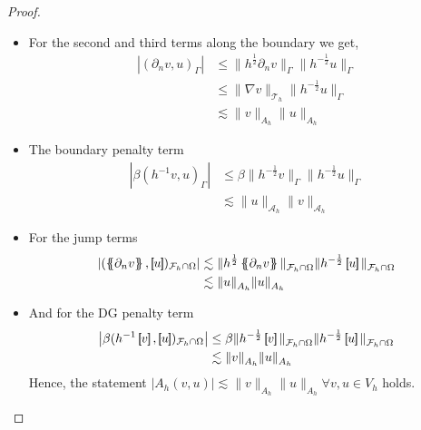 \begin{proof}
\begin{enumerate}[label=\arabic*)]
\begin{itemize}
        \item For the second and third terms along the boundary we get,
            \[
                \begin{split}
                 \left\lvert ( \partial _{n} v,  u)_{\Gamma } \right\rvert & \le \|h^{\frac{1}{2}} \partial _{n}v  \|_{ \Gamma   }^{  } \| h^{-\frac{1}{2}} u  \|_{ \Gamma  }^{  }  \\
                 & \le \| \nabla v \|_{\mathcal{T}_{h}   }^{  } \|h^{-\frac{1}{2}} u \|_{ \Gamma    }^{  } \\
                 & \lesssim   \| v \|_{A_{h}   }^{  } \| u \|_{ A_{h}    }^{  }
                \end{split}
            \]

        \item The boundary penalty term
            \[
                \begin{split}
                    \left\lvert\beta ( h^{-1} v,u)_{\Gamma }  \right\rvert  & \le \beta \| h^{-\frac{1}{2}} v \|_{\Gamma   }^{  } \| h^{-\frac{1}{2}} u \|_{\Gamma   }^{  } \\
                                                                            &\lesssim \| u \|_{\mathcal{A}_{h}   }^{  }\| v \|_{\mathcal{A}_{h}   }^{  }
                \end{split}
            \]

        \item For the jump terms \[
                \begin{split}
                    \left\lvert( \mean{ \partial _{n} v }  , \jump{ u }  ) _{\mathcal{F} _{h} \cap \Omega }  \right\rvert &\lesssim  \| h^{\frac{1}{2}} \mean{ \partial _{n} v }   \|_{ \mathcal{F}_{h}\cap \Omega   }^{  } \|h^{-\frac{1}{2}} \jump{ u }   \|_{ \mathcal{F}_{h}\cap
                    \Omega   }^{  } \\
&\lesssim  \| u   \|_{ A_{h}    }^{  } \|  u    \|_{ A_{h}   }^{  }
                \end{split}
        \]

    \item And for the DG penalty term
        \[
            \begin{split}
         \left\lvert \beta ( h^{-1} \jump{ v }  ,
         \jump{ u }  )_{\mathcal{F}_{h}\cap \Omega  } \right\rvert &\le  \beta \| h^{-\frac{1}{2}    }\jump{ v } \|_{ \mathcal{F}_{h} \cap \Omega  }^{  }\| h^{-\frac{1}{2}    }\jump{ u } \|_{\mathcal{F}_{h} \cap \Omega   }^{  } \\
    &\lesssim \| v \|_{A_{h}  }^{  } \| u \|_{A_{h}  }^{  }
            \end{split}
        \]
        Hence, the statement $\left\lvert A_{h}( v,u) \right\rvert \lesssim \| v \|_{A_{h}  }^{  }     \| u \|_{A_{h}  }^{  }  \forall v,u \in V_{h} $ holds.
    \end{itemize}


\end{enumerate}
\end{proof}
